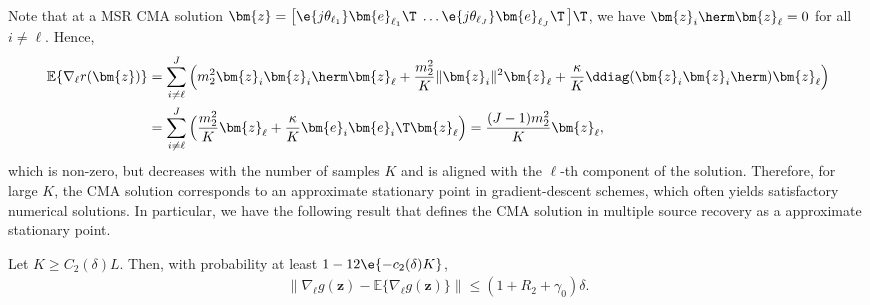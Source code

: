 Note that at a MSR CMA solution $\bm{z}=\big[\e{j\theta_{\ell_1}}\bm{e}_{\ell_1}\T\;\ldots\e{j\theta_{\ell_J}}\bm{e}_{\ell_J}\T\,\big]\T$, we have $\bm{z}_i\herm\bm{z}_{\ell}=0$ for all $i\neq {\ell}$. Hence,
\begin{align}
\mathbb{E}\{\nabla_{\ell} r(\bm{z})\}&= \sum_{i\neq {\ell}}^J\Big(   m_2^2\bm{z}_i\bm{z}_i\herm\bm{z}_{\ell} +\frac{m_2^2}{K}  \|\bm{z}_i\|^2\bm{z}_{\ell}+ \frac{\kappa}{K}  \ddiag(\bm{z}_i\bm{z}_i\herm)\bm{z}_{\ell}\Big)
	\nonumber\\&
= \sum_{i\neq {\ell}}^J\Big( \frac{m_2^2}{K}\bm{z}_{\ell}+ \frac{\kappa}{K}  \bm{e}_i\bm{e}_i\T\bm{z}_{\ell}\Big)\nonumber= \frac{(J-1)m_2^2}{K}\bm{z}_{\ell},\label{eqn:expectation_gradient_msr_z}
\end{align}
which is non-zero, but decreases with the number of samples $K$ and is aligned with the ${\ell}$-th component of the solution. Therefore, for large $K$, the CMA solution corresponds to an approximate stationary point in gradient-descent schemes, which often yields satisfactory numerical solutions. In particular, we have the following result that defines the CMA solution in multiple source recovery as a approximate stationary point.
\setcounter{thm}{14}
\begin{cor}\label{cor:gradient_regularizer_z}
Let $K\geq C_2(\delta)L$. Then, with probability at least $1-12\e{-c_2(\delta)K}$,\begin{align}
	\Big\|\nabla_{\ell} g(\bm{z})-\mathbb{E}\big\{\nabla_{\ell} g(\bm{z})\big\}\Big\|\leq (1+R_2+\gamma_0) \delta.\nonumber
\end{align}
\end{cor}
